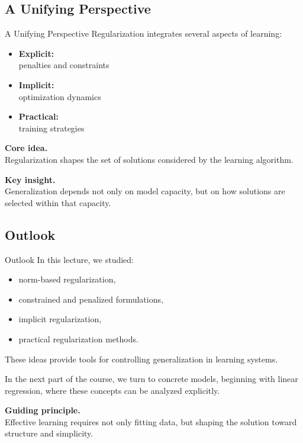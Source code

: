 \documentclass[aspectratio=169,11pt]{beamer}
\begin{document}
\subsection{A Unifying Perspective}
\begin{frame}[t,allowframebreaks]{A Unifying Perspective}
\small
Regularization integrates several aspects of learning:

\begin{itemize}
    \item \textbf{Explicit:}\\ penalties and constraints
    \item \textbf{Implicit:}\\ optimization dynamics
    \item \textbf{Practical:}\\ training strategies
\end{itemize}

\textbf{Core idea.}\\ Regularization shapes the set of solutions considered by the learning algorithm.

\textbf{Key insight.}\\ Generalization depends not only on model capacity, but on how solutions are selected within that capacity.
\end{frame}

\subsection{Outlook}
\begin{frame}[t,allowframebreaks]{Outlook}
\small
In this lecture, we studied:

\begin{itemize}
    \item norm-based regularization,
    \item constrained and penalized formulations,
    \item implicit regularization,
    \item practical regularization methods.
\end{itemize}

These ideas provide tools for controlling generalization in learning systems.

In the next part of the course, we turn to concrete models, beginning with linear regression, where these concepts can be analyzed explicitly.

\textbf{Guiding principle.}\\ Effective learning requires not only fitting data, but shaping the solution toward structure and simplicity.
\end{frame}
\end{document}
